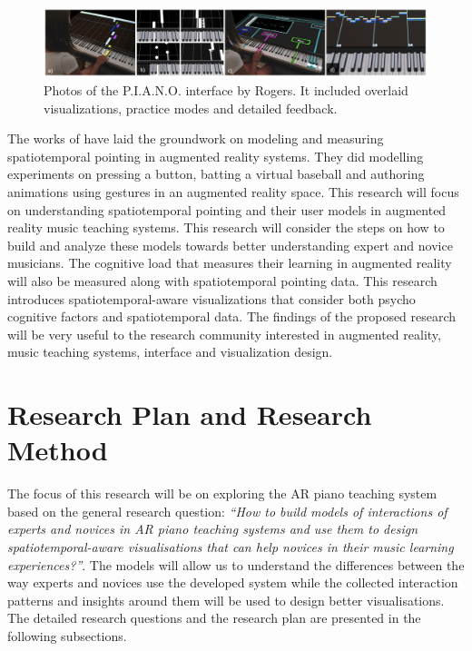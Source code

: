 \documentclass[manuscript,screen]{acmart}
\begin{document}
\begin{figure}[h]
\centering
 \includegraphics[width=12cm]{figures/pianoUBC.png}
    \caption{Photos of the P.I.A.N.O. interface by Rogers. It included overlaid visualizations, practice modes and detailed feedback. 
    }\label{fig:ubicomp}
\end{figure}
The works of \citet{liao2020button, lee2019geometrically, arora2019magicalhands} have laid the groundwork on modeling and measuring spatiotemporal pointing in augmented reality systems. They did modelling experiments on pressing a button, batting a virtual baseball and authoring animations using gestures in an augmented reality space. This research will focus on understanding spatiotemporal pointing and their user models in augmented reality music teaching systems. This research will consider the steps on how to build and analyze these models towards better understanding expert and novice musicians. The cognitive load that measures their learning in augmented reality will also be measured along with spatiotemporal pointing data. This research introduces spatiotemporal-aware visualizations that consider both psycho cognitive factors and spatiotemporal data. The findings of the proposed research will be very useful to the research community interested in augmented reality, music teaching systems, interface  and visualization design.

\section{Research Plan and Research Method}
The focus of this research will be on exploring the AR piano teaching system based on the general research question: \textit{“How to  build models of interactions of experts and novices in AR piano teaching systems and use them to design spatiotemporal-aware visualisations that can help novices in their music learning experiences?”}. The models will allow us to understand the differences between the way experts and novices use the developed system while the collected interaction patterns and insights around them will be used to design better visualisations. The detailed research questions and the research plan are presented in the following subsections. 
\end{document}
